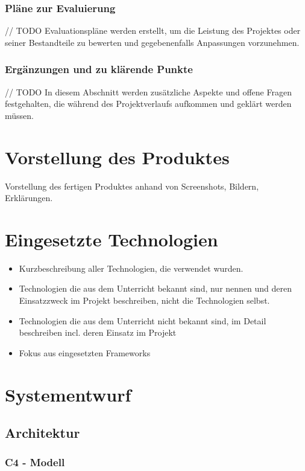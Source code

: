 \subsection{Pläne zur Evaluierung}
// TODO
Evaluationspläne werden erstellt, um die Leistung des Projektes oder seiner Bestandteile zu bewerten und gegebenenfalls Anpassungen vorzunehmen.

\subsection{Ergänzungen und zu klärende Punkte}
// TODO
In diesem Abschnitt werden zusätzliche Aspekte und offene Fragen festgehalten, die während des Projektverlaufs aufkommen und geklärt werden müssen.

\chapter{Vorstellung des Produktes}
Vorstellung des fertigen Produktes anhand von Screenshots, Bildern, Erklärungen.

\chapter{Eingesetzte Technologien}
\begin{itemize}
	\item Kurzbeschreibung aller Technologien, die verwendet wurden.
	\item Technologien die aus dem Unterricht bekannt sind, nur nennen und deren  Einsatzzweck im Projekt beschreiben, nicht die Technologien selbst.
	\item Technologien die aus dem Unterricht nicht bekannt sind, im Detail beschreiben incl. deren Einsatz im Projekt
	\item Fokus aus eingesetzten Frameworks
\end{itemize}

\chapter{Systementwurf}

\section{Architektur}

\subsection{C4 - Modell}

